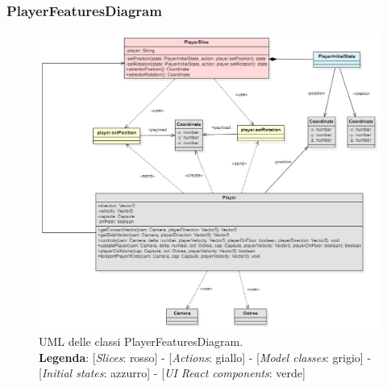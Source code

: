 	\begin{landscape}
		\thispagestyle{empty}
		\subsubsection{PlayerFeaturesDiagram}
		\begin{figure}[H]
			\centering
			\includegraphics[scale=0.7, keepaspectratio]{./res/images/PlayerFeaturesDiagram.PNG}
			\caption[UML delle classi PlayerFeaturesDiagram]{
			UML delle classi PlayerFeaturesDiagram.
			\\
			\textbf{Legenda}: 
			[\textit{Slices}: rosso] -
			[\textit{Actions}: giallo] -
			[\textit{Model classes}: grigio] -
			[\textit{Initial states}: azzurro] -
			[\textit{UI React components}: verde]}
		\end{figure}
	\end{landscape}
	\restoregeometry


